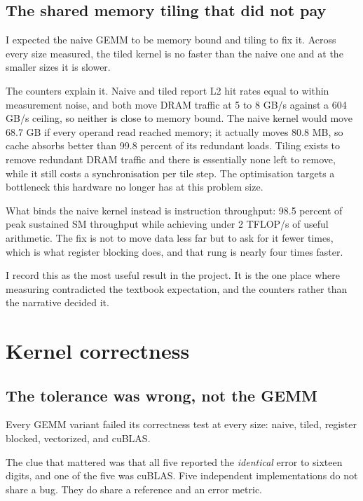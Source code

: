 ﻿\documentclass[11pt]{article}
\begin{document}
\subsection{The shared memory tiling that did not pay}

I expected the naive GEMM to be memory bound and tiling to fix it. Across every
size measured, the tiled kernel is no faster than the naive one and at the
smaller sizes it is slower.

The counters explain it. Naive and tiled report L2 hit rates equal to within
measurement noise, and both move DRAM traffic at 5 to 8 GB/s against a 604 GB/s
ceiling, so neither is close to memory bound. The naive kernel would move 68.7 GB
if every operand read reached memory; it actually moves 80.8 MB, so cache absorbs
better than 99.8 percent of its redundant loads. Tiling exists to remove redundant
DRAM traffic and there is essentially none left to remove, while it still costs a
synchronisation per tile step. The optimisation targets a bottleneck this hardware
no longer has at this problem size.

What binds the naive kernel instead is instruction throughput: 98.5 percent of
peak sustained SM throughput while achieving under 2 TFLOP/s of useful arithmetic.
The fix is not to move data less far but to ask for it fewer times, which is what
register blocking does, and that rung is nearly four times faster.

I record this as the most useful result in the project. It is the one place where
measuring contradicted the textbook expectation, and the counters rather than the
narrative decided it.

\section{Kernel correctness}

\subsection{The tolerance was wrong, not the GEMM}

Every GEMM variant failed its correctness test at every size: naive, tiled,
register blocked, vectorized, and cuBLAS.

The clue that mattered was that all five reported the \emph{identical} error to
sixteen digits, and one of the five was cuBLAS. Five independent implementations
do not share a bug. They do share a reference and an error metric.
\end{document}
